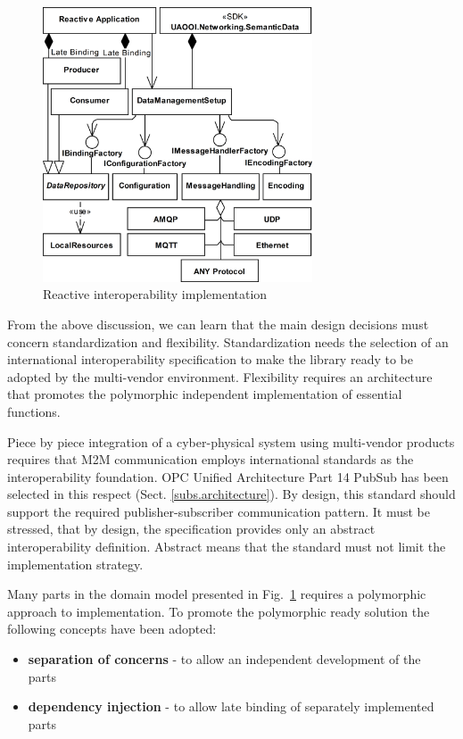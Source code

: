 \documentclass{article}
\begin{document}
\begin{figure}
      \centering
      \includegraphics[width=8cm]{../.Media/UADataApplicationArchitecture.png}
      \caption{Reactive interoperability implementation}\label{figure2.UADataApplicationArchitecture}
\end{figure}

From the above discussion, we can learn that the main design decisions must concern standardization and flexibility. Standardization needs the selection of an international interoperability specification to make the library ready to be adopted by the multi-vendor environment. Flexibility requires an architecture that promotes the polymorphic independent implementation of essential functions.

Piece by piece integration of a cyber-physical system using multi-vendor products requires that M2M communication employs international standards as the interoperability foundation. OPC Unified Architecture Part 14 PubSub has been selected in this respect (Sect. \ref*{subs.architecture}). By design, this standard should support the required publisher-subscriber communication pattern. It must be stressed, that by design, the specification provides only an abstract interoperability definition. Abstract means that the standard must not limit the implementation strategy.

Many parts in the domain model presented in Fig.~\ref*{figure2.UADataApplicationArchitecture} requires a polymorphic approach to implementation. To promote the polymorphic ready solution the following concepts have been adopted:

\begin{itemize}
      \item \textbf{separation of concerns} - to allow an independent development of the parts~\cite{RefWorks:doc:5d92609be4b02eb43d372bd1}
      \item \textbf{dependency injection} - to allow late binding of separately implemented parts~\cite{RefWorks:doc:5d925b77e4b030b4e0596f5d}
\end{itemize}
\end{document}

